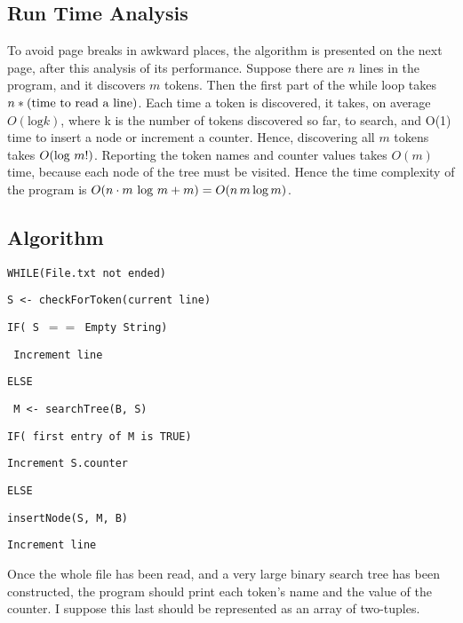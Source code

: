 \documentclass{article}
\newenvironment{changemargin}[2]{%
  \begin{list}{}{%
    \setlength{\topsep}{0pt}%
    \setlength{\leftmargin}{#1}%
    \setlength{\rightmargin}{#2}%
    \setlength{\parsep}{\parskip}%
  }%
  \item[]}{\end{list}}
\newcommand{\bM}{\begin{changemargin}{0.5cm}{0cm}}
\newcommand{\eM}{\end{changemargin}}
\newcommand{\n}{\newline}
\begin{document}

\subsection*{Run Time Analysis}
To avoid page breaks in awkward places, the algorithm is presented on the next page, after this analysis of its performance. Suppose there are $n$ lines in the program, and it discovers $m$ tokens. Then the first part of the while loop takes $n*(\textnormal{time to read a line})$. Each time a token is discovered, it takes, on average $O(\mathrm{log } k)$, where k is the number of tokens discovered so far, to search, and O(1) time to insert a node or increment a counter. Hence, discovering all $m$ tokens takes $ O(\textnormal{log }m!) $. Reporting the token names and counter values takes $O(m)$ time, because each node of the tree must be visited. Hence the time complexity of the program is $O(n \cdot m \textnormal{ log }m + m)= O(n \, m \, \mathrm{log} \, m)$.


\pagebreak


\subsection*{Algorithm}
 
\texttt{WHILE(File.txt not ended)} 
\bM 
	\texttt{S <- checkForToken(current line)   }
 	\bM
		\color{CadetBlue}{Checks the current line for tokens, if a is token found, returns the token, else empty string}
 	\eM
 	\texttt{IF( S $==$ \textnormal{Empty String})}
	\bM
		\texttt{ Increment line}
	 \eM
	\texttt{ELSE } 
	 \bM
	 	\texttt{ M <- searchTree(B, S) }
		\bM
		\eM
		\texttt{IF( first entry of M is TRUE)} 
		\bM
			\texttt{Increment S.counter}
			\bM
				\color{CadetBlue}{This step simply increases the value of the counter corresponding to the string, S.}
			\eM
		\eM	
		\texttt{ELSE}  
		\bM
			\texttt{insertNode(S, M, B)} 
			\bM
			\eM
		\eM
		\texttt{Increment line }\n
 \eM \eM
Once the whole file has been read, and a very large binary search tree has been constructed, the program should print each token's name and the value of the counter. I suppose this last should be represented as an array of two-tuples.
 

 
\end{document}
